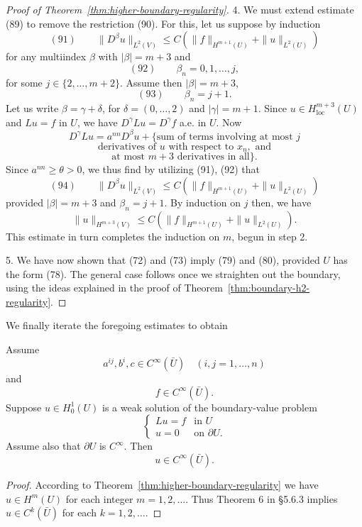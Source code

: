 \begin{proof}[Proof of Theorem~\ref{thm:higher-boundary-regularity}]
4. We must extend estimate (89) to remove the restriction (90). For this, let us suppose by induction
$$(91) \qquad \|D^\beta u\|_{L^2(V)} \leq C(\|f\|_{H^{m+1}(U)} + \|u\|_{L^2(U)})$$
for any multiindex $\beta$ with $|\beta| = m+3$ and
$$(92) \qquad \beta_n = 0, 1, \ldots, j,$$
for some $j \in \{2,\ldots,m+2\}$. Assume then $|\beta| = m+3$,
$$(93) \qquad \beta_n = j+1.$$
Let us write $\beta = \gamma+\delta$, for $\delta = (0,\ldots,2)$ and $|\gamma| = m+1$. Since $u \in H^{m+3}_{\text{loc}}(U)$ and $Lu = f$ in $U$, we have $D^\gamma Lu = D^\gamma f$ a.e. in $U$. Now
$$D^\gamma Lu = a^{nn}D^\beta u + \{\text{sum of terms involving at most } j$$
$$\text{derivatives of } u \text{ with respect to } x_n, \text{ and}$$
$$\text{at most } m+3 \text{ derivatives in all}\}.$$
Since $a^{nn} \geq \theta > 0$, we thus find by utilizing (91), (92) that
$$(94) \qquad \|D^\beta u\|_{L^2(V)} \leq C(\|f\|_{H^{m+1}(U)} + \|u\|_{L^2(U)})$$
provided $|\beta| = m+3$ and $\beta_n = j+1$. By induction on $j$ then, we have
$$\|u\|_{H^{m+3}(V)} \leq C(\|f\|_{H^{m+1}(U)} + \|u\|_{L^2(U)}).$$
This estimate in turn completes the induction on $m$, begun in step 2.

5. We have now shown that (72) and (73) imply (79) and (80), provided $U$ has the form (78). The general case follows once we straighten out the boundary, using the ideas explained in the proof of Theorem~\ref{thm:boundary-h2-regularity}.
\end{proof}

We finally iterate the foregoing estimates to obtain

\begin{theorem}
\label{thm:boundary-infinite-differentiability}
Assume
$$a^{ij}, b^i, c \in C^\infty(\bar U) \quad (i,j=1,\ldots,n)$$
and
$$f \in C^\infty(\bar U).$$
Suppose $u \in H_0^1(U)$ is a weak solution of the boundary-value problem
$$\begin{cases} Lu = f & \text{in } U \\ u = 0 & \text{on } \partial U. \end{cases}$$
Assume also that $\partial U$ is $C^\infty$. Then
$$u \in C^\infty(\bar U).$$
\end{theorem}

\begin{proof}
According to Theorem~\ref{thm:higher-boundary-regularity} we have $u \in H^m(U)$ for each integer $m = 1,2,\ldots$. Thus Theorem 6 in \S5.6.3 implies $u \in C^k(\bar U)$ for each $k = 1,2,\ldots$.
\end{proof}

